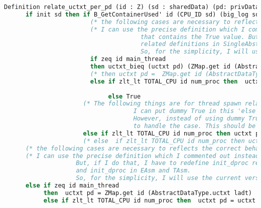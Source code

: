 \begin{lstlisting}[language=Caml]
    Definition relate_uctxt_per_pd (id : Z) (sd : sharedData) (pd: privData) (ladt : AbstractDataType.RData) :=
      if init sd then if B_GetContainerUsed' id (CPU_ID sd) (big_log sd) then 
                        (* the following cases are necessary to reflects the correct behaviour of the initialization *)
                        (* I can use the precise definition which I commented out instead of the version 
                                      that contains the True value. But, if I do that, I have to redefine init_dproc
                                      related definitions in SingleAbstractDataType and init_dproc in EAsm and TAsm.
                                      So, for the simplicity, I will use the current version *)
                        if zeq id main_thread 
                        then uctxt_bieq (uctxt pd) (ZMap.get id (AbstractDataType.uctxt ladt))
                        (* then uctxt pd =  ZMap.get id (AbstractDataType.uctxt ladt) *)
                        else if zlt_lt TOTAL_CPU id num_proc then  uctxt_bieq (uctxt pd) 
                                                                              (ZMap.get id (AbstractDataType.uctxt ladt))
                             else True
                      (* The following things are for thread spawn related_RData.
                                    I can put dummy True in this 'else' case, and prove the case for thread_spawn. 
                                    However, instead of using dummy True, I decided to add the precise value 
                                    to handle the case. This should be much better then the dummy True *)
                      else if zlt_lt TOTAL_CPU id num_proc then uctxt pd = uctxt (thread_init_dproc id) else True
                      (* else  if zlt_lt TOTAL_CPU id num_proc then uctxt pd = uctxt (thread_init_dproc id) else True *)
      (* the following cases are necessary to reflects the correct behaviour of the initialization *)
      (* I can use the precise definition which I commented out instead of the version that contains the True value.
                    But, if I do that, I have to redefine init_dproc related definitions in SingleAbstractDataType 
                    and init_dproc in EAsm and TAsm.
                    So, for the simplicity, I will use the current version *)
      else if zeq id main_thread 
           then  uctxt pd = ZMap.get id (AbstractDataType.uctxt ladt)
           else if zlt_lt TOTAL_CPU id num_proc then  uctxt pd = uctxt (thread_init_dproc id) else True.


\end{lstlisting}
